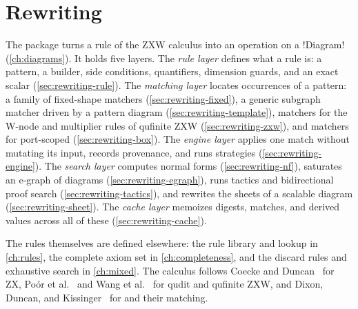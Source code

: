 \chapter{Rewriting}\label{ch:rewriting}
\sloppy

The package  turns a rule of the ZXW calculus into an operation on a
\py!Diagram! (\cref{ch:diagrams}). It holds five layers. The \emph{rule layer} defines what a rule
is: a pattern, a builder, side conditions, quantifiers, dimension guards, and an exact scalar
(\cref{sec:rewriting-rule}). The \emph{matching layer} locates occurrences of a pattern: a family of
fixed-shape matchers (\cref{sec:rewriting-fixed}), a generic subgraph matcher driven by a pattern
diagram (\cref{sec:rewriting-template}), matchers for the W-node and multiplier rules of qufinite
ZXW (\cref{sec:rewriting-zxw}), and matchers for port-scoped \bboxes{}
(\cref{sec:rewriting-box}). The \emph{engine layer} applies one match without mutating its input,
records provenance, and runs strategies (\cref{sec:rewriting-engine}). The \emph{search layer}
computes normal forms (\cref{sec:rewriting-nf}), saturates an e-graph of diagrams
(\cref{sec:rewriting-egraph}), runs tactics and bidirectional proof search
(\cref{sec:rewriting-tactics}), and rewrites the sheets of a scalable diagram
(\cref{sec:rewriting-sheet}). The \emph{cache layer} memoizes digests, matches, and derived values
across all of these (\cref{sec:rewriting-cache}).

The rules themselves are defined elsewhere: the rule library and lookup in \cref{ch:rules}, the
complete axiom set in \cref{ch:completeness}, and the discard rules and exhaustive search in
\cref{ch:mixed}. The calculus follows Coecke and Duncan~\cite{coecke2011interacting} for ZX,
Poór et al.~\cite{poor2023zxw} and Wang et al.~\cite{wang2021qufinite,wang2023qufinitezxw} for
qudit and qufinite ZXW, and Dixon, Duncan, and Kissinger~\cite{dixon2009graphical,kissinger2014pattern}
for \bboxes{} and their matching.

